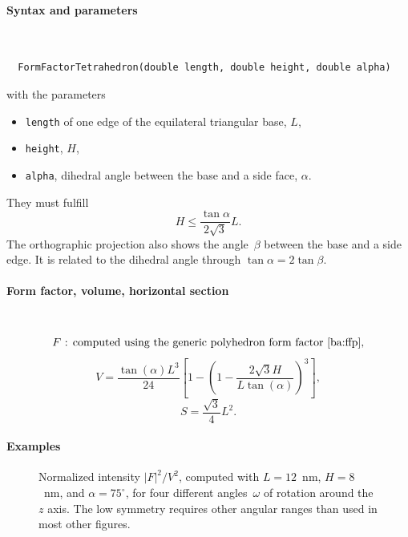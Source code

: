 \FloatBarrier

\paragraph{Syntax and parameters}\strut\\[-2ex plus .2ex minus .2ex]
\begin{lstlisting}
  FormFactorTetrahedron(double length, double height, double alpha)
\end{lstlisting}
with the parameters
\begin{itemize}
\item \texttt{length} of one edge of the equilateral triangular base, $L$,
\item \texttt{height}, $H$,
\item \texttt{alpha}, dihedral angle between the base and a side face, $\alpha$.
\end{itemize}
They must fulfill
\begin{displaymath}
  H\le \frac{\tan{\alpha}}{2\sqrt{3}} L.
\end{displaymath}
The orthographic projection also shows the angle~$\beta$ between the base and a side edge.
It is related to the dihedral angle through $\tan \alpha = 2 \tan \beta$.

\paragraph{Form factor, volume, horizontal section}\strut\\
\begin{equation*}
  F\text{~: computed using the generic polyhedron form factor~\cite{ba:ffp},}
\end{equation*}
\begin{equation*}
  V= \dfrac{\tan(\alpha) L^3}{24} \left[1- \left(1 -
  \dfrac{2\sqrt{3} H}{L \tan(\alpha)} \right)^3\right],
\end{equation*}
\begin{equation*}
  S =\dfrac{\sqrt{3}}{4}L^2.
\end{equation*}

\paragraph{Examples}\strut

\begin{figure}[H]
\begin{center}
\end{center}
\caption{Normalized intensity $|F|^2/V^2$,
computed with $L=12$~nm, $H=8$~nm, and $\alpha=75^\circ$,
for four different angles~$\omega$ of rotation around the $z$ axis.
The low symmetry requires other angular ranges than used in most other figures.}
\end{figure}

